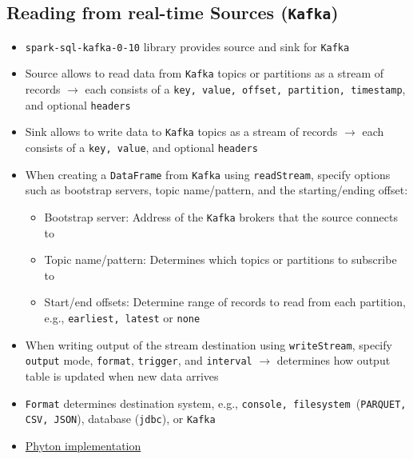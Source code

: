 \documentclass[11pt]{scrartcl}
\begin{document}
\subsection{Reading from real-time Sources (\texttt{Kafka})}
\begin{itemize}
	\item \texttt{spark-sql-kafka-0-10} library provides source and sink for \texttt{Kafka}
	\item Source allows to read data from \texttt{Kafka} topics or partitions as a stream of records $\to$ each consists of a \texttt{key, value, offset, partition, timestamp}, and optional \texttt{headers}
	\item Sink allows to write data to \texttt{Kafka} topics as a stream of records $\to$ each consists of a \texttt{key, value}, and optional \texttt{headers}
	\item When creating a \texttt{DataFrame} from \texttt{Kafka} using \texttt{readStream}, specify options such as bootstrap servers, topic name/pattern, and the starting/ending offset:
	\begin{itemize}
		\item Bootstrap server: Address of the \texttt{Kafka} brokers that the source connects to
		\item Topic name/pattern: Determines which topics or partitions to subscribe to
		\item Start/end offsets: Determine range of records to read from each partition, e.g., \texttt{earliest, latest} or \texttt{none}
	\end{itemize}
	\item When writing output of the stream destination using \texttt{writeStream}, specify \texttt{output} mode, \texttt{format}, \texttt{trigger}, and \texttt{interval} $\to$ determines how output table is updated when new data arrives
	\item \texttt{Format} determines destination system, e.g., \texttt{console, filesystem }(\texttt{PARQUET, CSV, JSON}), database (\texttt{jdbc}), or \texttt{Kafka}
	\item \hyperref[streaming_python]{Phyton implementation}
\end{itemize}

\newpage
\end{document}
